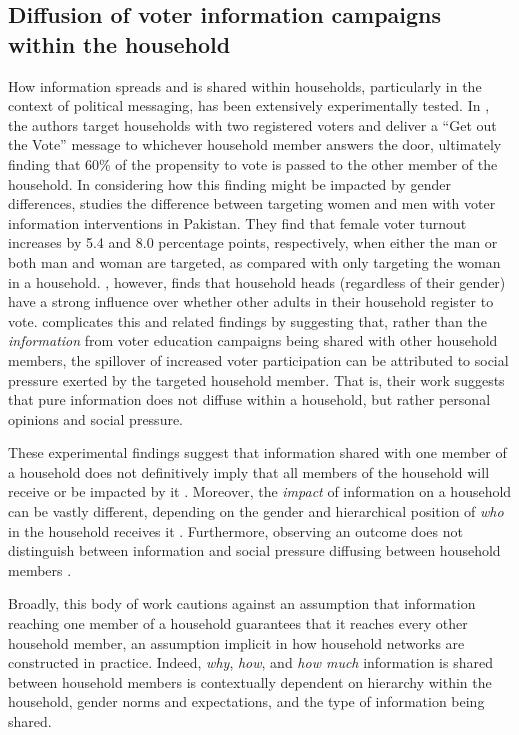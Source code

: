 \subsection*{Diffusion of voter information campaigns within the household}\label{subsec:gotv} 
How information spreads and is shared within households, particularly in the context of political messaging, has been extensively experimentally tested. 
In \citet{nickerson2008}, the authors target households with two registered voters and deliver a ``Get out the Vote'' message to whichever household member answers the door, ultimately finding that 60\% of the propensity to vote is passed to the other member of the household. In considering how this finding might be impacted by gender differences, \cite{cheema2023canvassing} studies the difference between targeting women and men with voter information interventions in Pakistan. They find that female voter turnout increases by 5.4 and 8.0 percentage points, respectively, when either the man or both man and woman are targeted, as compared with only targeting the woman in a household. \citet{ferrali2022registers}, however, finds that household heads (regardless of their gender) have a strong influence over whether other adults in their household register to vote. \citet{bhatti2017voter} complicates this and related findings by suggesting that, rather than the \textit{information} from voter education campaigns being shared with other household members, the spillover of increased voter participation can be attributed to social pressure exerted by the targeted household member. That is, their work suggests that pure information does not diffuse within a household, but rather personal opinions and social pressure.

These experimental findings suggest that information shared with one member of a household does not definitively imply that all members of the household will receive or be impacted by it \citep{nickerson2008}. Moreover, the \textit{impact} of information on a household can be vastly different, depending on the gender and hierarchical position of \textit{who} in the household receives it \citep{cheema2023canvassing, ferrali2022registers}. Furthermore, observing an outcome does not distinguish between information and social pressure diffusing between household members \citep{bhatti2017voter}. 

Broadly, this body of work cautions against an assumption that information reaching one member of a household guarantees that it reaches every other household member, an assumption implicit in how household networks are constructed in practice. Indeed, \textit{why}, \textit{how}, and \textit{how much} information is shared between household members is contextually dependent on hierarchy within the household, gender norms and expectations, and the type of information being shared. 

